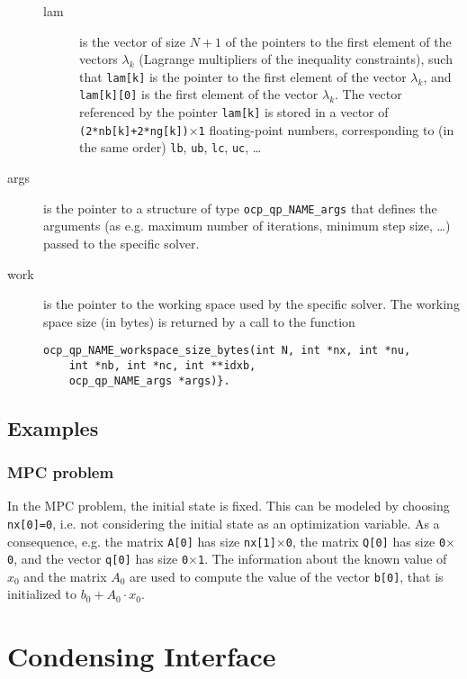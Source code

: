 \documentclass{report}
\begin{document}
\begin{description}
\begin{description}
		\item[lam] is the vector of size $N+1$ of the pointers to the first element of the vectors $\lambda_k$ (Lagrange multipliers of the inequality constraints), such that \texttt{lam[k]} is the pointer to the first element of the vector $\lambda_k$, and \texttt{lam[k][0]} is the first element of the vector $\lambda_k$.
		The vector referenced by the pointer \texttt{lam[k]} is stored in a vector of \texttt{(2*nb[k]+2*ng[k])$\times$1} floating-point numbers, corresponding to (in the same order) \texttt{lb}, \texttt{ub}, \texttt{lc}, \texttt{uc}, \ldots
	\end{description}
	\item[args] is the pointer to a structure of type \texttt{ocp\_qp\_NAME\_args} that defines the arguments (as e.g. maximum number of iterations, minimum step size, \ldots) passed to the specific solver.
	\item[work] is the pointer to the working space used by the specific solver.
The working space size (in bytes) is returned by a call to the function 
\begin{verbatim}
ocp_qp_NAME_workspace_size_bytes(int N, int *nx, int *nu, 
    int *nb, int *nc, int **idxb, 
    ocp_qp_NAME_args *args)}. 
\end{verbatim}
\end{description}

\subsection{Examples}

\subsubsection{MPC problem}

In the MPC problem, the initial state is fixed.
This can be modeled by choosing \texttt{nx[0]=0}, i.e. not considering the initial state as an optimization variable.
As a consequence, e.g. the matrix \texttt{A[0]} has size \texttt{nx[1]$\times$0}, the matrix \texttt{Q[0]} has size \texttt{0$\times$0}, and the vector \texttt{q[0]} has size \texttt{0$\times$1}.
The information about the known value of $x_0$ and the matrix $A_0$ are used to compute the value of the vector \texttt{b[0]}, that is initialized to $b_0 + A_0 \cdot x_0$.

\section{Condensing Interface}
\end{document}
